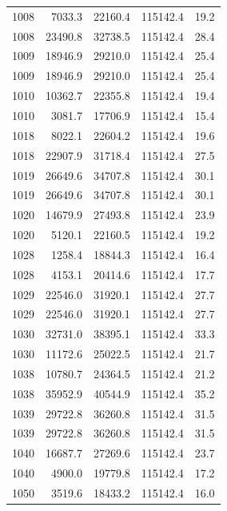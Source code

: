 \begin{longtable}{rrrrr}
    1008 & \num{7033.3} & \num{22160.4} & \num{115142.4} & 19.2 \\
    1008 & \num{23490.8} & \num{32738.5} & \num{115142.4} & 28.4 \\
    1009 & \num{18946.9} & \num{29210.0} & \num{115142.4} & 25.4 \\
    1009 & \num{18946.9} & \num{29210.0} & \num{115142.4} & 25.4 \\
    1010 & \num{10362.7} & \num{22355.8} & \num{115142.4} & 19.4 \\
    1010 & \num{3081.7} & \num{17706.9} & \num{115142.4} & 15.4 \\
    1018 & \num{8022.1} & \num{22604.2} & \num{115142.4} & 19.6 \\
    1018 & \num{22907.9} & \num{31718.4} & \num{115142.4} & 27.5 \\
    1019 & \num{26649.6} & \num{34707.8} & \num{115142.4} & 30.1 \\
    1019 & \num{26649.6} & \num{34707.8} & \num{115142.4} & 30.1 \\
    1020 & \num{14679.9} & \num{27493.8} & \num{115142.4} & 23.9 \\
    1020 & \num{5120.1} & \num{22160.5} & \num{115142.4} & 19.2 \\
    1028 & \num{1258.4} & \num{18844.3} & \num{115142.4} & 16.4 \\
    1028 & \num{4153.1} & \num{20414.6} & \num{115142.4} & 17.7 \\
    1029 & \num{22546.0} & \num{31920.1} & \num{115142.4} & 27.7 \\
    1029 & \num{22546.0} & \num{31920.1} & \num{115142.4} & 27.7 \\
    1030 & \num{32731.0} & \num{38395.1} & \num{115142.4} & 33.3 \\
    1030 & \num{11172.6} & \num{25022.5} & \num{115142.4} & 21.7 \\
    1038 & \num{10780.7} & \num{24364.5} & \num{115142.4} & 21.2 \\
    1038 & \num{35952.9} & \num{40544.9} & \num{115142.4} & 35.2 \\
    1039 & \num{29722.8} & \num{36260.8} & \num{115142.4} & 31.5 \\
    1039 & \num{29722.8} & \num{36260.8} & \num{115142.4} & 31.5 \\
    1040 & \num{16687.7} & \num{27269.6} & \num{115142.4} & 23.7 \\
    1040 & \num{4900.0} & \num{19779.8} & \num{115142.4} & 17.2 \\
    1050 & \num{3519.6} & \num{18433.2} & \num{115142.4} & 16.0 \\

\end{longtable}
